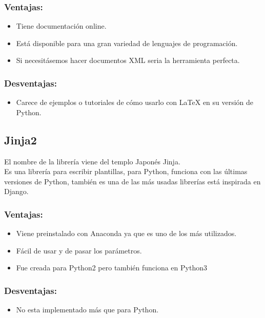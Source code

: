 \subsubsection{Ventajas:}

\begin{itemize}
\item Tiene documentación online.
\item Está disponible para una gran variedad de lenguajes de programación.
\item Si necesitásemos hacer documentos XML seria la herramienta perfecta.
\end{itemize}

\subsubsection{Desventajas:}
\begin{itemize}
\item Carece de ejemplos o tutoriales de cómo usarlo con LaTeX en su versión de Python.
\end{itemize}


\subsection{Jinja2}

El nombre de la librería viene del templo Japonés Jinja.\\
Es una librería para escribir plantillas, para Python, funciona con las últimas versiones de Python, también es una de las más usadas librerías está inspirada en Django.


\subsubsection{Ventajas:}
\begin{itemize}
\item Viene preinstalado con Anaconda ya que es uno de los más utilizados.
\item Fácil de usar y de pasar los parámetros.
\item Fue creada para Python2 pero también funciona en Python3
\end{itemize}

\subsubsection{Desventajas:}
\begin{itemize}
\item No esta implementado más que para Python.
\end{itemize}

